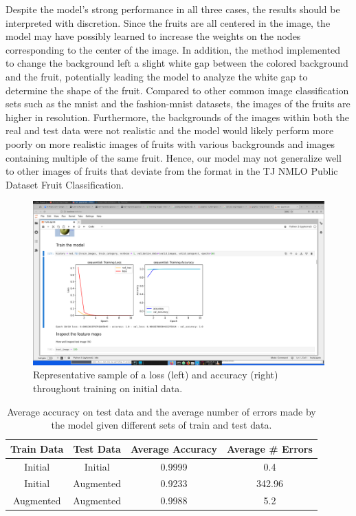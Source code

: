 \documentclass[11pt]{article}
\begin{document}
Despite the model's strong performance in all three cases, the results should be interpreted with discretion. Since the fruits are all centered in the image, the model may have possibly learned to increase the weights on the nodes corresponding to the center of the image. In addition, the method implemented to change the background left a slight white gap between the colored background and the fruit, potentially leading the model to analyze the white gap to determine the shape of the fruit. Compared to other common image classification sets such as the mnist \cite{mnist_tensorflow} and the fashion-mnist \cite{fashion_mnist_tensorflow} datasets, the images of the fruits are higher in resolution. Furthermore, the backgrounds of the images within both the real and test data were not realistic and the model would likely perform more poorly on more realistic images of fruits with various backgrounds and images containing multiple of the same fruit. Hence, our model may not generalize well to other images of fruits that deviate from the format in the TJ NMLO Public Dataset Fruit Classification.

\begin{figure}[t]
\begin{center}
\includegraphics[scale=0.3, trim={5cm 10.8cm 18cm 17cm}, clip]{train_model.png}
\end{center}
\caption{\centering Representative sample of a loss (left) and accuracy (right) throughout training on initial data.}
\label{Train Model}
\end{figure}


\begin{table}[htbp]
\centering
\begin{tabular}{||c|c|c|c||} 
 \hline
 Train Data & Test Data & Average Accuracy & Average \# Errors\\ [0.5ex] 
 \hline\hline
 Initial & Initial & 0.9999 & 0.4\\ 
 \hline
 Initial & Augmented & 0.9233 & 342.96\\
 \hline
 Augmented & Augmented & 0.9988 & 5.2\\
 \hline
\end{tabular}
\caption{\centering Average accuracy on test data and the average number of errors made by the model given different sets of train and test data.}
\label{tab:accuracy_errors}
\end{table}
\end{document}
